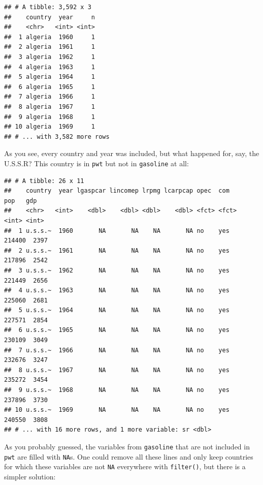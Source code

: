 \documentclass[]{gitbook}
\newenvironment{Shaded}{\begin{snugshade}}{\end{snugshade}}
\newcommand{\KeywordTok}[1]{\textcolor[rgb]{0.13,0.29,0.53}{\textbf{#1}}}
\newcommand{\NormalTok}[1]{#1}
\newcommand{\OperatorTok}[1]{\textcolor[rgb]{0.81,0.36,0.00}{\textbf{#1}}}
\newcommand{\StringTok}[1]{\textcolor[rgb]{0.31,0.60,0.02}{#1}}
\theoremstyle{definition}
\theoremstyle{definition}
\theoremstyle{definition}
\theoremstyle{remark}
\begin{document}
\begin{verbatim}
## # A tibble: 3,592 x 3
##    country  year     n
##    <chr>   <int> <int>
##  1 algeria  1960     1
##  2 algeria  1961     1
##  3 algeria  1962     1
##  4 algeria  1963     1
##  5 algeria  1964     1
##  6 algeria  1965     1
##  7 algeria  1966     1
##  8 algeria  1967     1
##  9 algeria  1968     1
## 10 algeria  1969     1
## # ... with 3,582 more rows
\end{verbatim}

As you see, every country and year was included, but what happened for,
say, the U.S.S.R? This country is in \texttt{pwt} but not in
\texttt{gasoline} at all:

\begin{Shaded}
\end{Shaded}

\begin{verbatim}
## # A tibble: 26 x 11
##    country  year lgaspcar lincomep lrpmg lcarpcap opec  com      pop   gdp
##    <chr>   <int>    <dbl>    <dbl> <dbl>    <dbl> <fct> <fct>  <int> <int>
##  1 u.s.s.~  1960       NA       NA    NA       NA no    yes   214400  2397
##  2 u.s.s.~  1961       NA       NA    NA       NA no    yes   217896  2542
##  3 u.s.s.~  1962       NA       NA    NA       NA no    yes   221449  2656
##  4 u.s.s.~  1963       NA       NA    NA       NA no    yes   225060  2681
##  5 u.s.s.~  1964       NA       NA    NA       NA no    yes   227571  2854
##  6 u.s.s.~  1965       NA       NA    NA       NA no    yes   230109  3049
##  7 u.s.s.~  1966       NA       NA    NA       NA no    yes   232676  3247
##  8 u.s.s.~  1967       NA       NA    NA       NA no    yes   235272  3454
##  9 u.s.s.~  1968       NA       NA    NA       NA no    yes   237896  3730
## 10 u.s.s.~  1969       NA       NA    NA       NA no    yes   240550  3808
## # ... with 16 more rows, and 1 more variable: sr <dbl>
\end{verbatim}

As you probably guessed, the variables from \texttt{gasoline} that are
not included in \texttt{pwt} are filled with \texttt{NA}s. One could
remove all these lines and only keep countries for which these variables
are not \texttt{NA} everywhere with \texttt{filter()}, but there is a
simpler solution:
\end{document}
